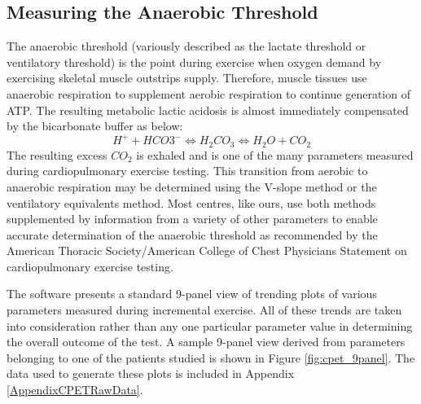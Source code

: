 \subsection{Measuring the Anaerobic Threshold}
The anaerobic threshold (variously described as the lactate threshold or ventilatory threshold) is the point during exercise when oxygen demand by exercising skeletal muscle outstrips supply. Therefore, muscle tissues use anaerobic respiration to supplement aerobic respiration to continue generation of ATP. The resulting metabolic lactic acidosis is almost immediately compensated by the bicarbonate buffer as below: 
\begin{equation} \label{eq:bicarb_buffer}
	H^+ + HCO3^- \Longleftrightarrow H_2CO_3 \Longleftrightarrow H_2O + CO_2
\end{equation}
The resulting excess $CO_2$ is exhaled and is one of the many parameters measured during cardiopulmonary exercise testing. This transition from aerobic to anaerobic respiration may be determined using the V-slope method\parencite{sue_metabolic_1988} or the ventilatory equivalents method.\parencite{beaver_new_1986} Most centres, like ours, use both methods supplemented by information from a variety of other parameters to enable accurate determination of the anaerobic threshold as recommended by the American Thoracic Society/American College of Chest Physicians Statement on cardiopulmonary exercise testing.\parencite{society_ats/accp_2003}

The software presents a standard 9-panel view of trending plots of various parameters measured during incremental exercise. All of these trends are taken into consideration rather than any one particular parameter value in determining the overall outcome of the test. A sample 9-panel view derived from parameters belonging to one of the patients studied is shown in Figure \ref{fig:cpet_9panel}. The data used to generate these plots is included in Appendix \ref{AppendixCPETRawData}. 

